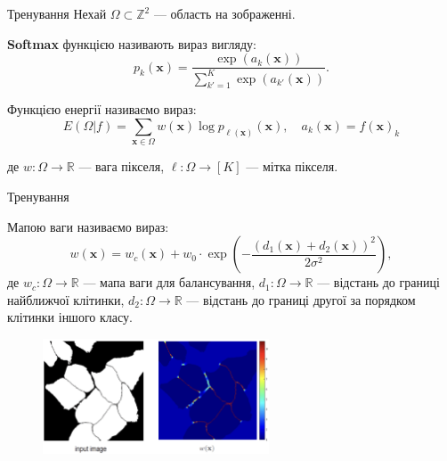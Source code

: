 \documentclass{zkdl-presentation-template}
\begin{document}
    \begin{frame}{Тренування}
        Нехай $\Omega \subset \mathbb{Z}^2$ --- область на зображенні.
        \begin{definition}
            \textbf{Softmax} функцією називають вираз вигляду:
            \begin{equation*}
                p_k(\boldsymbol{x}) = \frac{\exp(a_k(\boldsymbol{x}))}{\sum_{k'=1}^K \exp(a_{k'}(\boldsymbol{x}))}.
            \end{equation*}
        \end{definition}

        \begin{definition}
            Функцією енергії називаємо вираз:
            \begin{equation*}
                E(\Omega | f) = \sum_{\boldsymbol{x} \in \Omega} w(\boldsymbol{x})\log p_{\ell(\boldsymbol{x})}(\boldsymbol{x}), \quad a_k(\boldsymbol{x}) = f(\boldsymbol{x})_k
            \end{equation*}

            де $w: \Omega \to \mathbb{R}$ --- вага пікселя, $\ell: \Omega \to [K]$ --- мітка пікселя.
        \end{definition}
    \end{frame}

    \begin{frame}{Тренування}
        \begin{definition}
            Мапою ваги називаємо вираз:
            \begin{equation*}
                w(\boldsymbol{x}) = w_c(\boldsymbol{x}) + w_0 \cdot \exp\left(-\frac{(d_1(\boldsymbol{x})+d_2(\boldsymbol{x}))^2}{2\sigma^2}\right),
            \end{equation*}
            де $w_c: \Omega \to \mathbb{R}$ --- мапа ваги для балансування, $d_1: \Omega \to \mathbb{R}$ --- відстань до границі найближчої клітинки, $d_2: \Omega \to \mathbb{R}$ --- відстань до границі другої за порядком клітинки іншого класу.
        \end{definition}

        \begin{figure}
            \centering
            \includegraphics[width=0.6\textwidth]{images/unet_weightmap.png}
        \end{figure}
    \end{frame}
\end{document}
